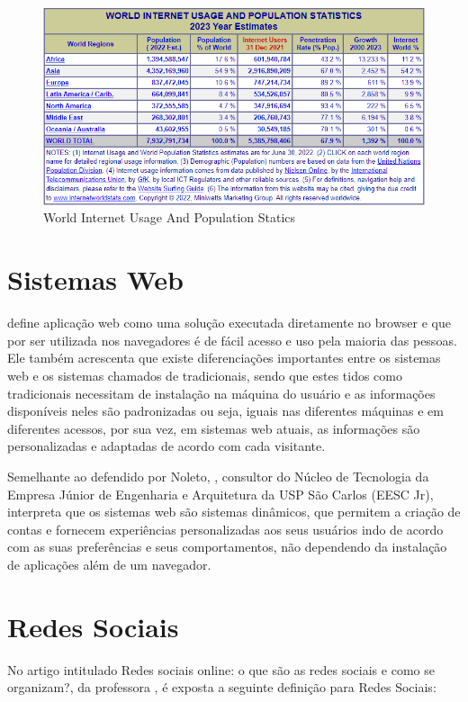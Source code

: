 \begin{figure}[htb]
     \centering
     \includegraphics[width=14cm]{arquivos/Figuras/figura 01.png}
     \caption{World Internet Usage And Population Statics}
     \label{fig:Informatização}
\end{figure}


\newpage
\section{Sistemas Web}
\label{sec:SistemasWeb}
 define aplicação web como uma solução executada diretamente no browser e que por ser utilizada nos navegadores é de fácil acesso e uso pela maioria das pessoas. Ele também acrescenta que existe diferenciações importantes entre os sistemas web e os sistemas chamados de tradicionais, sendo que estes tidos como tradicionais necessitam de instalação na máquina do usuário e as informações disponíveis neles são padronizadas ou seja, iguais nas diferentes máquinas e em diferentes acessos, por sua vez, em sistemas web atuais, as informações são personalizadas e adaptadas de acordo com cada visitante.

Semelhante ao defendido por Noleto, , consultor do Núcleo de Tecnologia da Empresa Júnior de Engenharia e Arquitetura da USP São Carlos (\gls{EESC Jr}), interpreta que os sistemas web são sistemas dinâmicos, que permitem a criação de contas e fornecem experiências personalizadas aos seus usuários indo de acordo com as suas preferências e seus comportamentos, não dependendo da instalação de aplicações além de um navegador.

\section{Redes Sociais}
\label{sec:RedesSociais}
No artigo intitulado Redes sociais online: o que são as redes sociais e como se organizam?, da professora , é exposta a seguinte definição para Redes Sociais: 

